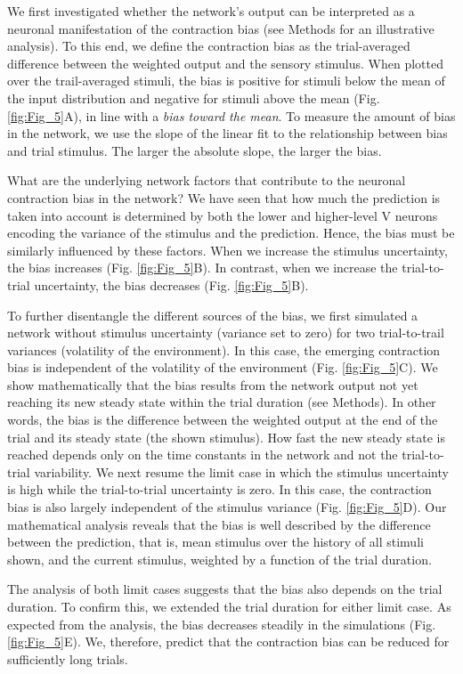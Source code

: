 \documentclass[10pt,a4paper]{article}
\begin{document}
We first investigated whether the network's output can be interpreted as a neuronal manifestation of the contraction bias (see Methods for an illustrative analysis). To this end, we define the contraction bias as the trial-averaged difference between the weighted output and the sensory stimulus. When plotted over the trail-averaged stimuli, the bias is positive for stimuli below the mean of the input distribution and negative for stimuli above the mean (Fig. \ref{fig:Fig_5}A), in line with a \textit{bias toward the mean}. To measure the amount of bias in the network, we use the slope of the linear fit to the relationship between bias and trial stimulus. The larger the absolute slope, the larger the bias. 

What are the underlying network factors that contribute to the neuronal contraction bias in the network? We have seen that how much the prediction is taken into account is determined by both the lower and higher-level V neurons encoding the variance of the stimulus and the prediction. Hence, the bias must be similarly influenced by these factors. When we increase the stimulus uncertainty, the bias increases (Fig. \ref{fig:Fig_5}B). In contrast, when we increase the trial-to-trial uncertainty, the bias decreases (Fig. \ref{fig:Fig_5}B). 

To further disentangle the different sources of the bias, we first simulated a network without stimulus uncertainty (variance set to zero) for two trial-to-trail variances (volatility of the environment). In this case, the emerging contraction bias is independent of the volatility of the environment (Fig. \ref{fig:Fig_5}C). We show mathematically that the bias results from the network output not yet reaching its new steady state within the trial duration (see Methods). In other words, the bias is the difference between the weighted output at the end of the trial and its steady state (the shown stimulus). How fast the new steady state is reached depends only on the time constants in the network and not the trial-to-trial variability. We next resume the limit case in which the stimulus uncertainty is high while the trial-to-trial uncertainty is zero. In this case, the contraction bias is also largely independent of the stimulus variance (Fig. \ref{fig:Fig_5}D). Our mathematical analysis reveals that the bias is well described by the difference between the prediction, that is, mean stimulus over the history of all stimuli shown, and the current stimulus, weighted by a function of the trial duration. 

The analysis of both limit cases suggests that the bias also depends on the trial duration. To confirm this, we extended the trial duration for either limit case. As expected from the analysis, the bias decreases steadily in the simulations (Fig. \ref{fig:Fig_5}E). We, therefore, predict that the contraction bias can be reduced for sufficiently long trials. 
\end{document}
